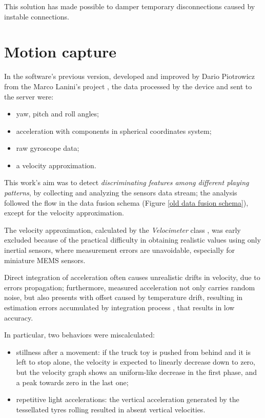 This solution has made possible to damper temporary disconnections caused by instable connections.

\section{Motion capture}
In the software's previous version, developed and improved by Dario Piotrowicz \cite{Pio19} from the Marco Lanini's project \cite{Lan17}, the data processed by the device and sent to the server were:
\begin{itemize}
	\item yaw, pitch and roll angles;
	\item acceleration with components in spherical coordinates system;
	\item raw gyroscope data;
	\item a velocity approximation.
\end{itemize}

This work's aim was to detect \textit{discriminating features among different playing patterns}, by collecting and analyzing the sensors data stream; the analysis followed the flow in the data fusion schema (Figure \ref{old data fusion schema}), except for the velocity approximation.
\bigbreak

The velocity approximation, calculated by the \textit{Velocimeter} class \cite{Pio19}, was early excluded because of the practical difficulty in obtaining realistic values using only inertial sensors, where measurement errors are unavoidable, especially for miniature MEMS sensors.

Direct integration of acceleration often causes unrealistic drifts in velocity, due to errors propagation; furthermore, measured acceleration not only carries random noise, but also presents with offset caused by temperature drift, resulting in estimation errors accumulated by integration process \cite{Du15, Est14, Kow15, Liu01, Sei07, UsingAcc, Woo07, Yan06}, that results in low accuracy.

In particular, two behaviors were miscalculated:
\begin{itemize}
	\item stillness after a movement: if the truck toy is pushed from behind and it is left to stop alone, the velocity is expected to linearly decrease down to zero, but the velocity graph shows an uniform-like decrease in the first phase, and a peak towards zero in the last one;
	\item repetitive light accelerations: the vertical acceleration generated by the tessellated tyres rolling resulted in absent vertical velocities.
\end{itemize}

